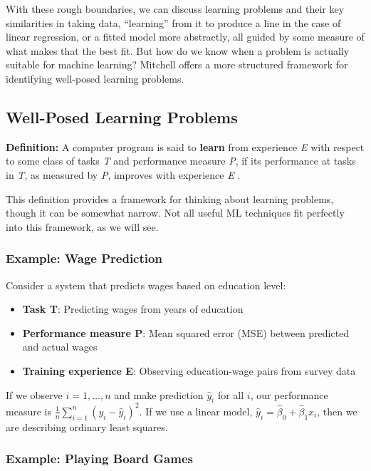 With these rough boundaries, we can discuss learning problems and their key similarities in taking data, ``learning'' from it to produce a line in the case of linear regression, or a fitted model more abstractly, all guided by some measure of what makes that the best fit. But how do we know when a problem is actually suitable for machine learning? Mitchell offers a more structured framework for identifying well-posed learning problems.

\subsection{Well-Posed Learning Problems}

\textbf{Definition:} A computer program is said to \textbf{learn} from experience \textit{E} with respect to some class of tasks \textit{T} and performance measure \textit{P}, if its performance at tasks in \textit{T}, as measured by \textit{P}, improves with experience \textit{E} \cite{mitchell1997machine}.

This definition provides a framework for thinking about learning problems, though it can be somewhat narrow. Not all useful ML techniques fit perfectly into this framework, as we will see.

\subsubsection{Example: Wage Prediction}

Consider a system that predicts wages based on education level:

\begin{itemize}
\item \textbf{Task T}: Predicting wages from years of education
\item \textbf{Performance measure P}: Mean squared error (MSE) between predicted and actual wages
\item \textbf{Training experience E}: Observing education-wage pairs from survey data
\end{itemize}

If we observe $i=1,\dots,n$ and make prediction $\hat{y}_i$ for all $i$, our performance measure is $\frac{1}{n}\sum_{i=1}^{n} (y_i -\hat{y}_i)^2$. If we use a linear model, $\hat{y}_i=\hat{\beta}_0 + \hat{\beta}_1x_i$, then we are describing ordinary least squares.

\subsubsection{Example: Playing Board Games}

